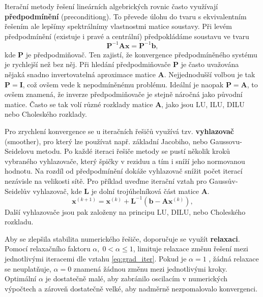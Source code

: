 \documentclass[a4paper,12pt]{report}
\theoremstyle{remark}
\begin{document}
	Iterační metody řešení lineárních algebrických rovnic často využívají \textbf{předpodmínění} (preconditiong). To převede úlohu do tvaru s ekvivalentním řešením ale lepšímy spektrálnímy vlastnostmi matice soustavy.  Při levém předpodmínění (existuje i pravé a centrální) předpokládáme soustavu ve tvaru
\begin{equation}
	\boldsymbol{P}^{-1}\boldsymbol{A}\boldsymbol{x} =\boldsymbol{P}^{-1}\boldsymbol{b},
\end{equation}
kde $\boldsymbol{P}$ je předpodmiňovač. Ten zajistí, že konvergence předpodmíněného systému je rychlejší než bez něj. Při hledání předpodmiňovače $\boldsymbol{P}$ je často uvažována nějaká snadno invertovatelná aproximace matice $\boldsymbol{A}$. Nejjednodušší volbou je tak $\boldsymbol{P} = \boldsymbol{I}$, což ovšem vede k nepodmíněnému problému. Ideální je naopak $\boldsymbol{P} = \boldsymbol{A}$, to ovšem znamená, že inverze předpodmiňovače je stejně náročná jako původní matice. Často se tak volí různé rozklady matice $\boldsymbol{A}$, jako jsou LU, ILU, DILU nebo Choleského rozklady.
	
	Pro zrychlení konvergence se u iteračních řešičů využívá tzv. \textbf{vyhlazovač} (smoother), pro který lze používat např. základní Jacobiho, nebo Gaussovu-Seidelovu metodu. Po každé iteraci řešiče metody se pustí několik kroků vybraného vyhlazovače, který  špičky v reziduu a tím i sníží jeho normovanou hodnotu. Na rozdíl od předpodmínění dokáže vyhlazovač snížit počet iterací nezávisle na velikosti sítě. Pro příklad uveďme iterační vztah pro Gaussův-Seidelův vyhlazovač, kde $\boldsymbol{L}$ je dolní trojúhelníková část matice $\boldsymbol{A}$.
	\begin{equation}
		\boldsymbol{x} ^{(k+1)} = \boldsymbol{x}^{(k)} +\boldsymbol{L}^{-1}(\boldsymbol{b} -  \boldsymbol{A}\boldsymbol{x} ^{(k)}),
		\label{eq:gs_smoother}
	\end{equation}
Další vyhlazovače jsou pak založeny na principu LU, DILU, nebo Choleského rozkladu.
	
	Aby se zlepšila stabilita numerického řešiče, doporučuje se využít \textbf{relaxaci}. Pomocí relaxačního faktoru $\alpha,\; 0 < \alpha \leq 1 $, limituje relaxace změnu řešení mezi jednotlivými iteracemi dle vztahu \eqref{eq:grad_iter}. Pokud je   $\alpha = 1$ , žádná relaxace se neuplatňuje, $\alpha = 0$ znamená žádnou změnu mezi jednotlivými kroky.   Optimální $\alpha$ je dostatečně malé, aby zabránilo oscilacím v numerických výpočtech a zároveň dostatečně velké, aby nadměrně nezpomalovalo konvergenci. 
	
\end{document}
